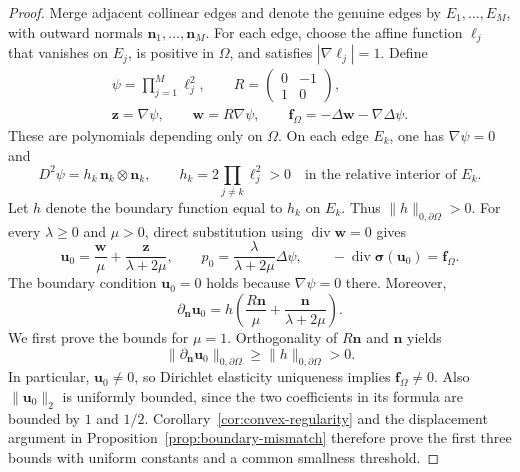\documentclass[10pt]{amsart}
\renewcommand{\div}{\operatorname{div}}
\numberwithin{equation}{section}
\begin{document}
\begin{proof}
Merge adjacent collinear edges and denote the genuine edges by $E_1,\ldots,E_M$, with outward normals $\boldsymbol n_1,\ldots,\boldsymbol n_M$. For each edge, choose the affine function $\ell_j$ that vanishes on $E_j$, is positive in $\Omega$, and satisfies $|\nabla\ell_j|=1$. Define
\[
\begin{gathered}
\psi=\prod_{j=1}^M\ell_j^2,\qquad
R=\begin{pmatrix}0&-1\\1&0\end{pmatrix},\\
\boldsymbol z=\nabla\psi,\qquad \boldsymbol w=R\nabla\psi,\qquad
\boldsymbol f_\Omega=-\Delta\boldsymbol w-\nabla\Delta\psi.
\end{gathered}
\]
These are polynomials depending only on $\Omega$. On each edge $E_k$, one has $\nabla\psi=0$ and
\[
D^2\psi=h_k\,\boldsymbol n_k\otimes\boldsymbol n_k,
\qquad
h_k=2\prod_{j\ne k}\ell_j^2>0
\quad\text{in the relative interior of }E_k.
\]
Let $h$ denote the boundary function equal to $h_k$ on $E_k$. Thus $\|h\|_{0,\partial\Omega}>0$. For every $\lambda\geq0$ and $\mu>0$, direct substitution using $\div\boldsymbol w=0$ gives
\[
\boldsymbol u_0=\frac{\boldsymbol w}{\mu}+\frac{\boldsymbol z}{\lambda+2\mu},
\qquad
p_0=\frac{\lambda}{\lambda+2\mu}\Delta\psi,
\qquad
-\div\boldsymbol\sigma(\boldsymbol u_0)=\boldsymbol f_\Omega.
\]
The boundary condition $\boldsymbol u_0=0$ holds because $\nabla\psi=0$ there. Moreover,
\[
\partial_{\boldsymbol n}\boldsymbol u_0
=h\left(\frac{R\boldsymbol n}{\mu}+\frac{\boldsymbol n}{\lambda+2\mu}\right).
\]
We first prove the bounds for $\mu=1$. Orthogonality of $R\boldsymbol n$ and $\boldsymbol n$ yields
\[
\|\partial_{\boldsymbol n}\boldsymbol u_0\|_{0,\partial\Omega}
\geq\|h\|_{0,\partial\Omega}>0.
\]
In particular, $\boldsymbol u_0\ne0$, so Dirichlet elasticity uniqueness implies $\boldsymbol f_\Omega\ne0$. Also $\|\boldsymbol u_0\|_2$ is uniformly bounded, since the two coefficients in its formula are bounded by $1$ and $1/2$. Corollary~\ref{cor:convex-regularity} and the displacement argument in Proposition~\ref{prop:boundary-mismatch} therefore prove the first three bounds with uniform constants and a common smallness threshold.


\end{proof}
\end{document}
